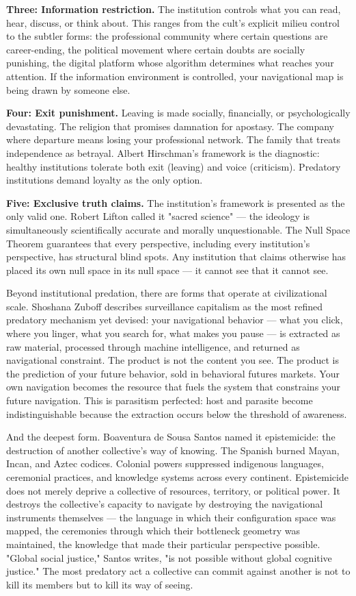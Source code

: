 \textbf{Three: Information restriction.} The institution controls what you can read, hear, discuss, or think about. This ranges from the cult's explicit milieu control to the subtler forms: the professional community where certain questions are career-ending, the political movement where certain doubts are socially punishing, the digital platform whose algorithm determines what reaches your attention. If the information environment is controlled, your navigational map is being drawn by someone else.


\textbf{Four: Exit punishment.} Leaving is made socially, financially, or psychologically devastating. The religion that promises damnation for apostasy. The company where departure means losing your professional network. The family that treats independence as betrayal. Albert Hirschman's framework is the diagnostic: healthy institutions tolerate both exit (leaving) and voice (criticism). Predatory institutions demand loyalty as the only option.


\textbf{Five: Exclusive truth claims.} The institution's framework is presented as the only valid one. Robert Lifton called it "sacred science" — the ideology is simultaneously scientifically accurate and morally unquestionable. The Null Space Theorem guarantees that every perspective, including every institution's perspective, has structural blind spots. Any institution that claims otherwise has placed its own null space in its null space — it cannot see that it cannot see.


Beyond institutional predation, there are forms that operate at civilizational scale. Shoshana Zuboff describes surveillance capitalism as the most refined predatory mechanism yet devised: your navigational behavior — what you click, where you linger, what you search for, what makes you pause — is extracted as raw material, processed through machine intelligence, and returned as navigational constraint. The product is not the content you see. The product is the prediction of your future behavior, sold in behavioral futures markets. Your own navigation becomes the resource that fuels the system that constrains your future navigation. This is parasitism perfected: host and parasite become indistinguishable because the extraction occurs below the threshold of awareness.


And the deepest form. Boaventura de Sousa Santos named it epistemicide: the destruction of another collective's way of knowing. The Spanish burned Mayan, Incan, and Aztec codices. Colonial powers suppressed indigenous languages, ceremonial practices, and knowledge systems across every continent. Epistemicide does not merely deprive a collective of resources, territory, or political power. It destroys the collective's capacity to navigate by destroying the navigational instruments themselves — the language in which their configuration space was mapped, the ceremonies through which their bottleneck geometry was maintained, the knowledge that made their particular perspective possible. "Global social justice," Santos writes, "is not possible without global cognitive justice." The most predatory act a collective can commit against another is not to kill its members but to kill its way of seeing.


